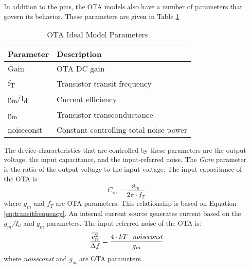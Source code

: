 In addition to the pins, the OTA models also have a number of parameters that govern its behavior. These parameters are given in Table \ref{tab:otaparams}
\begin{table}[htbp]
\begin{center}
\begin{tabular}{|l|l|}
\hline
Parameter & Description \\ \hline
Gain & OTA DC gain \\ \hline
f\textsubscript{T} & Transistor transit frequency \\ \hline
g\textsubscript{m}/I\textsubscript{d} & Current efficiency \\ \hline
g\textsubscript{m} & Transistor transconductance \\ \hline
noiseconst & Constant controlling total noise power \\ \hline
\end{tabular}
\end{center}
\caption{OTA Ideal Model Parameters}
\label{tab:otaparams}
\end{table}
The device characteristics that are controlled by these parameters are the output voltage, the input capacitance, and the input-referred noise. The \emph{Gain} parameter is the ratio of the output voltage to the input voltage. The input capacitance of the OTA is:
\begin{equation}
C_{in} = \dfrac{g_{m}}{2\pi\cdot f_{T}}
\end{equation}
where $g_{m}$ and $f_{T}$ are OTA parameters. This relationship is based on Equation \ref{eq:transitfrequency}. An internal current source generates current based on the \emph{$g_{m}$/$I_{d}$} and \emph{$g_{m}$} parameters. The input-referred noise of the OTA is:
\begin{equation}
\label{eq:idealotanoise}
\dfrac{\overline{v_{n}^{2}}}{\Delta f} = \dfrac{4\cdot kT\cdot\emph{noiseconst}}{\emph{$g_{m}$}}
\end{equation}
where \emph{noiseconst} and \emph{$g_{m}$} are OTA parameters.

